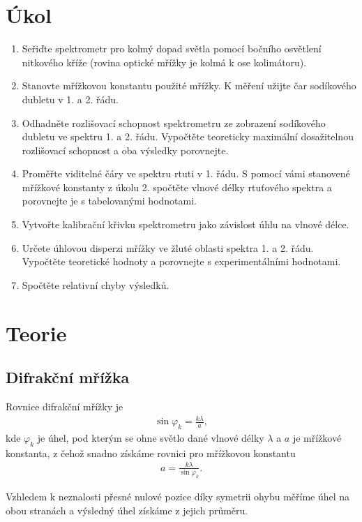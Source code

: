 \documentclass[a4paper,12pt]{article}
\begin{document}
\newcommand{\st}{^{\circ}}

\section{Úkol}
\begin{enumerate}
    \item Seřiďte spektrometr pro kolmý dopad světla pomocí bočního osvětlení nitkového kříže (rovina optické mřížky je kolmá k ose kolimátoru).
    \item Stanovte mřížkovou konstantu použité mřížky. K měření užijte čar sodíkového dubletu v 1. a 2. řádu.
    \item Odhadněte rozlišovací schopnost spektrometru ze zobrazení sodíkového dubletu ve spektru 1. a 2. řádu. 
    Vypočtěte teoreticky maximální dosažitelnou rozlišovací schopnost a oba výsledky porovnejte.
    \item Proměřte viditelné čáry ve spektru rtuti v 1. řádu. S pomocí vámi stanovené mřížkové konstanty z úkolu 2. spočtěte vlnové délky rtuťového spektra a porovnejte je s tabelovanými hodnotami.
    \item Vytvořte kalibrační křivku spektrometru jako závislost úhlu na vlnové délce.
    \item Určete úhlovou disperzi mřížky ve žluté oblasti spektra 1. a 2. řádu. Vypočtěte teoretické hodnoty a porovnejte s experimentálními hodnotami.
    \item Spočtěte relativní chyby výsledků. 
\end{enumerate}

\section{Teorie}
\subsection{Difrakční mřížka}
Rovnice difrakční mřížky je
\begin{eqnarray}
\sin\varphi_k=\frac{k\lambda}{a},
\end{eqnarray}
kde $\varphi_k$ je úhel, pod kterým se ohne světlo dané vlnové délky $\lambda$ a $a$ je mřížkové konstanta, z čehož snadno získáme rovnici pro mřížkovou konstantu
\begin{eqnarray}
a=\frac{k\lambda}{\sin\varphi_k}.
\label{a}
\end{eqnarray}

Vzhledem k neznalosti přesné nulové pozice díky symetrii ohybu měříme úhel na obou stranách a výsledný úhel získáme z jejich průměru.
\end{document}
